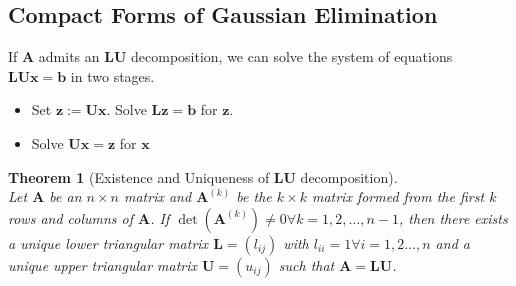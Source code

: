 \documentclass[12pt]{article}
\newtheorem{theorem}{Theorem}[section]
\theoremstyle{definition}
\begin{document}
\subsection{Compact Forms of Gaussian Elimination}
If $\mathbf{A}$ admits an $\mathbf{LU}$ decomposition, we can solve the system of equations $\mathbf{LUx}=\mathbf{b}$ in two stages.
\begin{itemize}
  \item Set $\mathbf{z}:=\mathbf{Ux}$. Solve $\mathbf{Lz}=\mathbf{b}$ for $\mathbf{z}$.
  \item Solve $\mathbf{Ux}=\mathbf{z}$ for $\mathbf{x}$
\end{itemize}
\begin{theorem}[Existence and Uniqueness of $\mathbf{LU}$ decomposition]
\hfill\\\normalfont Let $\mathbf{A}$ be an $n\times n$ matrix and $\mathbf{A}^{(k)}$ be the $k\times k$ matrix formed from the first $k$ rows and columns of $\mathbf{A}$. If $\det(\mathbf{A}^{(k)})\neq 0 \forall k = 1,2,\ldots, n-1$, then there exists a unique lower triangular matrix $\mathbf{L}=(l_{ij})$ with $l_{ii}=1 \forall i=1,2\ldots,n$ and a unique upper triangular matrix $\mathbf{U}=(u_{ij})$ such that $\mathbf{A}=\mathbf{LU}$.
\end{theorem}
\end{document}
